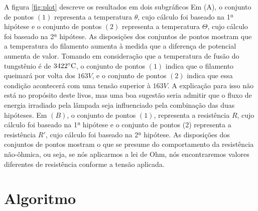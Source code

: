\documentclass[12pt]{article}
\begin{document}
A figura \ref{fig:plot} descreve os resultados em dois subgráficos Em (A), o conjunto de pontos $(1)$ representa a temperatura $\theta$, cujo cálculo foi baseado na 1ª hipótese e o conjunto de pontos $(2)$ representa a temperatura $\Theta$, cujo cálculo foi baseado na 2ª hipótese. As disposições dos conjuntos de pontos mostram que a temperatura do filamento aumenta à medida que a diferença de potencial aumenta de valor. Tomando em consideração que a temperatura de fusão do tungstênio é de $3422\celsius$, o conjunto de pontos $(1)$ indica que o filamento queimará por volta dos $163V$, e o conjunto de pontos $(2)$ indica que essa condição acontecerá com uma tensão superior à $163V$. A explicação para isso não está no propósito deste livos, mas uma boa sugestão seria admitir que o fluxo de energia irradiado pela lâmpada seja influenciado pela combinação das duas hipóteses.    
Em $(B)$, o conjunto de pontos $(1)$, representa a resistência $R$, cujo cálculo foi baseado na 1ª hipótese e o conjunto de pontos (2) representa a resistência $R'$, cujo cálculo foi baseado na 2ª hipótese. As disposições dos conjuntos de pontos mostram o que se presume do comportamento da resistência não-ôhmica, ou seja, se nós aplicarmos a lei de Ohm, nós encontraremos valores diferentes de resistência conforme a tensão aplicada.




\newpage
\appendix
\section{Algoritmo}
\end{document}
